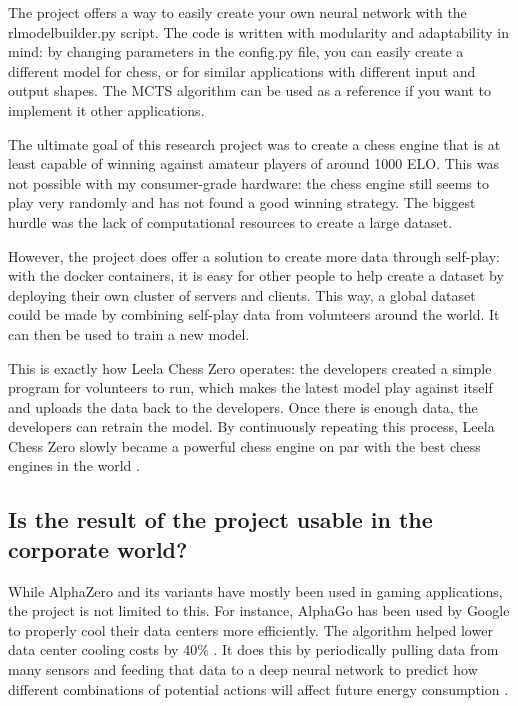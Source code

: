 \documentclass{article}
\begin{document}
The project offers a way to easily create your own neural network with the rlmodelbuilder.py script.
The code is written with modularity and adaptability in mind: by changing parameters in the config.py file, 
you can easily create a different model for chess, or for similar applications with different input and output shapes. 
The MCTS algorithm can be used as a reference if you want to implement it other applications.

The ultimate goal of this research project was to create a chess engine that is at least capable of winning
against amateur players of around 1000 ELO. This was not possible with my consumer-grade hardware: 
the chess engine still seems to play very randomly and has not found a good winning strategy. 
The biggest hurdle was the lack of computational resources to create a large dataset.

However, the project does offer a solution to create more data through self-play: with the docker containers, 
it is easy for other people to help create a dataset by deploying their own cluster of servers and clients. 
This way, a global dataset could be made by combining self-play data from volunteers around the world. 
It can then be used to train a new model. 

This is exactly how Leela Chess Zero operates: the developers created a simple program for volunteers to run,
which makes the latest model play against itself and uploads the data back to the developers. Once there is
enough data, the developers can retrain the model. By continuously repeating this process, Leela Chess Zero
slowly became a powerful chess engine on par with the best chess engines in the world \cite{TopChessEngine2022}.

\subsection{Is the result of the project usable in the corporate world?}

While AlphaZero and its variants have mostly been used in gaming applications, 
the project is not limited to this. For instance, AlphaGo has been used by Google
to properly cool their data centers more efficiently. The algorithm helped lower
data center cooling costs by 40\% \cite{decemberHasGoogleCracked2020}. 
It does this by periodically pulling data from many sensors and feeding that data to 
a deep neural network to predict how different combinations of potential actions
will affect future energy consumption \cite{HowAIHelps2018}.
\end{document}
